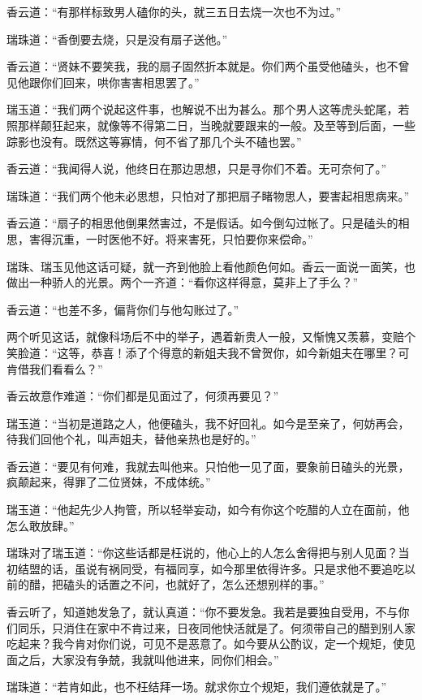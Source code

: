 \documentclass[a4paper,12pt,UTF8,twoside]{ctexbook}
\begin{document}
香云道：“有那样标致男人磕你的头，就三五日去烧一次也不为过。”

瑞珠道：“香倒要去烧，只是没有扇子送他。”

香云道：“贤妹不要笑我，我的扇子固然折本就是。你们两个虽受他磕头，也不曾见他跟你们回来，哄你害害相思罢了。”

瑞玉道：“我们两个说起这件事，也解说不出为甚么。那个男人这等虎头蛇尾，若照那样颠狂起来，就像等不得第二日，当晚就要跟来的一般。及至等到后面，一些踪影也没有。既然这等寡情，何不省了那几个头不磕也罢。”

香云道：“我闻得人说，他终日在那边思想，只是寻你们不着。无可奈何了。”

瑞珠道：“我们两个他未必思想，只怕对了那把扇子睹物思人，要害起相思病来。”

香云道：“扇子的相思他倒果然害过，不是假话。如今倒勾过帐了。只是磕头的相思，害得沉重，一时医他不好。将来害死，只怕要你来偿命。”

瑞珠、瑞玉见他这话可疑，就一齐到他脸上看他颜色何如。香云一面说一面笑，也做出一种骄人的光景。两个一齐道：“看你这样得意，莫非上了手么？”

香云道：“也差不多，偏背你们与他勾账过了。”

两个听见这话，就像科场后不中的举子，遇着新贵人一般，又惭愧又羡慕，变赔个笑脸道：“这等，恭喜！添了个得意的新姐夫我不曾贺你，如今新姐夫在哪里？可肯借我们看看么？”

香云故意作难道：“你们都是见面过了，何须再要见？”

瑞玉道：“当初是道路之人，他便磕头，我不好回礼。如今是至亲了，何妨再会，待我们回他个礼，叫声姐夫，替他亲热也是好的。”

香云道：“要见有何难，我就去叫他来。只怕他一见了面，要象前日磕头的光景，疯颠起来，得罪了二位贤妹，不成体统。”

瑞玉道：“他起先少人拘管，所以轻举妄动，如今有你这个吃醋的人立在面前，他怎么敢放肆。”

瑞珠对了瑞玉道：“你这些话都是枉说的，他心上的人怎么舍得把与别人见面？当初结盟的话，虽说有祸同受，有福同享，如今那里依得许多。只是求他不要追吃以前的醋，把磕头的话置之不问，也就好了，怎么还想别样的事。”

香云听了，知道她发急了，就认真道：“你不要发急。我若是要独自受用，不与你们同乐，只消住在家中不肯过来，日夜同他快活就是了。何须带自己的醋到别人家吃起来？我今肯对你们说，可见不是恶意了。如今要从公酌议，定一个规矩，使见面之后，大家没有争兢，我就叫他进来，同你们相会。”

瑞珠道：“若肯如此，也不枉结拜一场。就求你立个规矩，我们遵依就是了。”
\end{document}

